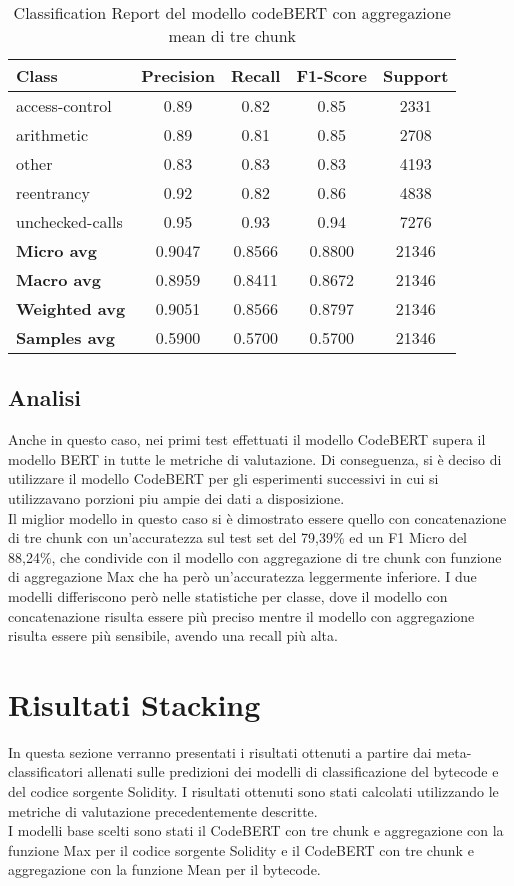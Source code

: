 \documentclass[../../Thesis.tex]{subfiles}
\begin{document}
\begin{table}[H]
    \centering
    \small
    \begin{tabular}{lcccc}
    \hline
    \textbf{Class} & \textbf{Precision} & \textbf{Recall} & \textbf{F1-Score} & \textbf{Support} \\
    \hline
    access-control & 0.89 & 0.82 & 0.85 & 2331 \\
    arithmetic & 0.89 & 0.81 & 0.85 & 2708 \\
    other & 0.83 & 0.83 & 0.83 & 4193 \\
    reentrancy & 0.92 & 0.82 & 0.86 & 4838 \\
    unchecked-calls & 0.95 & 0.93 & 0.94 & 7276 \\
    \hline
    \textbf{Micro avg} & 0.9047 & 0.8566 & 0.8800 & 21346 \\
    \textbf{Macro avg} & 0.8959 & 0.8411 & 0.8672 & 21346 \\
    \textbf{Weighted avg} & 0.9051 & 0.8566 & 0.8797 & 21346 \\
    \textbf{Samples avg} & 0.5900 & 0.5700 & 0.5700 & 21346 \\
    \hline
    \end{tabular}
    \caption{Classification Report del modello codeBERT con aggregazione mean di tre chunk}
    \end{table}
\subsection{Analisi}
Anche in questo caso, nei primi test effettuati il modello CodeBERT supera il modello BERT in tutte le metriche di valutazione. Di conseguenza, si è deciso di utilizzare il modello CodeBERT per gli esperimenti successivi in cui si utilizzavano porzioni piu ampie dei dati a disposizione.\\
Il miglior modello in questo caso si è dimostrato essere quello con concatenazione di tre chunk  con un'accuratezza sul test set del 79,39\% ed un F1 Micro del 88,24\%, che condivide con il modello con aggregazione di tre chunk con funzione di aggregazione Max che ha però un'accuratezza leggermente inferiore. I due modelli differiscono però nelle statistiche per classe, dove il modello con concatenazione risulta essere più preciso mentre il modello con aggregazione risulta essere più sensibile, avendo una recall più alta.\\



\section{Risultati Stacking}
In questa sezione verranno presentati i risultati ottenuti a partire dai meta-classificatori allenati sulle predizioni dei modelli di classificazione del bytecode e del codice sorgente Solidity. I risultati ottenuti sono stati calcolati utilizzando le metriche di valutazione precedentemente descritte.\\
I modelli base scelti sono stati il CodeBERT con tre chunk e aggregazione con la funzione Max per il codice sorgente Solidity e il CodeBERT con tre chunk e aggregazione con la funzione Mean per il bytecode.\\
\end{document}
